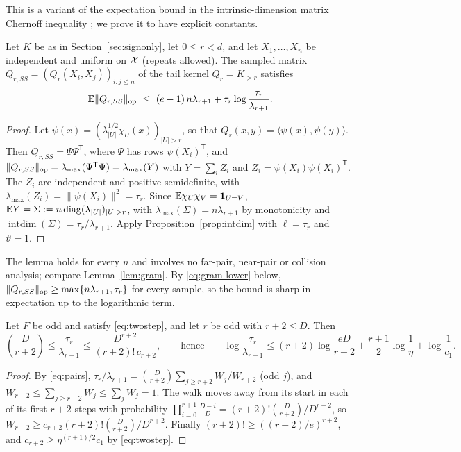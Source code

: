 This is a variant of the expectation bound in the intrinsic-dimension
matrix Chernoff inequality \cite[Chapter~7]{tropp2015}; we prove it to
have explicit constants.

\begin{lemma}\label{lem:tailgram}
Let $K$ be as in Section~\ref{sec:signonly}, let $0\le r<d$, and let
$X_1,\ldots,X_n$ be independent and uniform on $\mathcal X$ (repeats allowed). The
sampled matrix $Q_{r,SS}=(Q_r(X_i,X_j))_{i,j\le n}$ of the tail kernel
$Q_r=K_{>r}$ satisfies
\[
 \E\|Q_{r,SS}\|_{\rm op}\ \le\ (e-1)\,n\lambda_{r+1}
 +\tau_r\log\frac{\tau_r}{\lambda_{r+1}} .
\]
\end{lemma}
\begin{proof}
Let $\psi(x)=(\lambda_{|U|}^{1/2}\chi_U(x))_{|U|>r}$, so that
$Q_r(x,y)=\langle\psi(x),\psi(y)\rangle$. Then $Q_{r,SS}=\Psi\Psi^{\mathsf T}$,
where $\Psi$ has rows $\psi(X_i)^{\mathsf T}$, and
$\|Q_{r,SS}\|_{\rm op}=\lambda_{\max}(\Psi^{\mathsf T}\Psi)=\lambda_{\max}(Y)$
with $Y=\sum_iZ_i$ and $Z_i=\psi(X_i)\psi(X_i)^{\mathsf T}$. The $Z_i$ are
independent and positive semidefinite, with
$\lambda_{\max}(Z_i)=\|\psi(X_i)\|^2=\tau_r$. Since
$\mathbb E\chi_U\chi_V=\mathbf 1_{U=V}$, $\E Y=\Sigma:=n\operatorname{diag}
(\lambda_{|U|})_{|U|>r}$, with $\lambda_{\max}(\Sigma)=n\lambda_{r+1}$ by
monotonicity and $\operatorname{intdim}(\Sigma)=\tau_r/\lambda_{r+1}$.
Apply Proposition~\ref{prop:intdim} with $\ell=\tau_r$ and $\vartheta=1$.
\end{proof}

The lemma holds for every $n$ and involves no far-pair, near-pair or
collision analysis; compare Lemma~\ref{lem:gram}. By \eqref{eq:gram-lower}
below, $\|Q_{r,SS}\|_{\rm op}\ge\max\{n\lambda_{r+1},\tau_r\}$ for every
sample, so the bound is sharp in expectation up to the logarithmic term.

\begin{lemma}\label{lem:intdim-tanh}
Let $F$ be odd and satisfy \eqref{eq:twostep}, and let $r$ be odd with
$r+2\le D$. Then
\[
 \binom D{r+2}\le\frac{\tau_r}{\lambda_{r+1}}\le
 \frac{D^{r+2}}{(r+2)!\,c_{r+2}},\qquad\text{hence}\qquad
 \log\frac{\tau_r}{\lambda_{r+1}}\le(r+2)\log\frac{eD}{r+2}
 +\frac{r+1}2\log\frac1\eta+\log\frac1{c_1}.
\]
\end{lemma}
\begin{proof}
By \eqref{eq:pairs},
$\tau_r/\lambda_{r+1}=\binom D{r+2}\sum_{j\ge r+2}W_j/W_{r+2}$ (odd $j$),
and $W_{r+2}\le\sum_{j\ge r+2}W_j\le\sum_jW_j=1$. The walk moves away from
its start in each of its first $r+2$ steps with probability
$\prod_{i=0}^{r+1}\frac{D-i}D=(r+2)!\binom D{r+2}/D^{r+2}$, so
$W_{r+2}\ge c_{r+2}(r+2)!\binom D{r+2}/D^{r+2}$. Finally
$(r+2)!\ge((r+2)/e)^{r+2}$, and $c_{r+2}\ge\eta^{(r+1)/2}c_1$ by
\eqref{eq:twostep}.
\end{proof}


